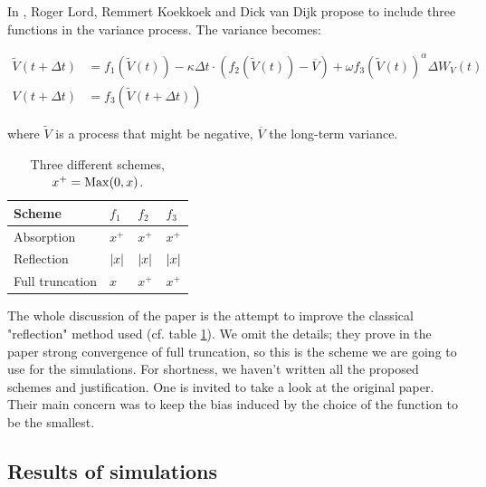 In \cite{reflexion}, Roger Lord, Remmert Koekkoek and Dick van Dijk propose to include three functions in the variance process. The variance becomes:

\begin{align*}
\widetilde{V}(t + \Delta t) &= f_1( \widetilde{V} (t) ) - \kappa \Delta t \cdot \left ( f_2( \widetilde{V}(t) ) - \overline{V} \right ) + \omega  f_3( \widetilde{ V} (t) )^\alpha \Delta W_V(t) \\
V(t+\Delta t ) &= f_3 ( \widetilde{V}(t + \Delta t) ) 
\end{align*}

where $\widetilde{V}$ is a process that might be negative, $ \overline{V}$ the long-term variance.


\begin{table}
\begin{center}
\begin{tabular}{  | m{3 cm} | m{1.5 cm} | m{1.5 cm} | m{1.5 cm} | } 
\hline
Scheme & $f_1$ & $f_2$ & $f_3$  \\ 
\hline
\hline
Absorption & $  x^+ $ & $ x^+ $ & $ x^+ $ \\
\hline
Reflection & $ \lvert x\rvert $ & $ \lvert x\rvert $ & $ \lvert x\rvert $ \\
\hline
Full truncation & $ x $ & $ x^+ $  & $ x^+ $ \\
\hline

\end{tabular}
\caption{Three different schemes, $x^+ = \operatorname*{Max}(0,x) $.}
\label{tab:reflections}
\end{center}
\end{table}

The whole discussion of the paper is the attempt to improve the classical "reflection" method used (cf. table \ref{tab:reflections}). We omit the details; they prove in the paper strong convergence of full truncation, so this is the scheme we are going to use for the simulations. For shortness, we haven't written all the proposed schemes and justification. One is invited to take a look at the original paper. Their main concern was to keep the bias induced by the choice of the function to be the smallest.












\subsection{Results of simulations}

